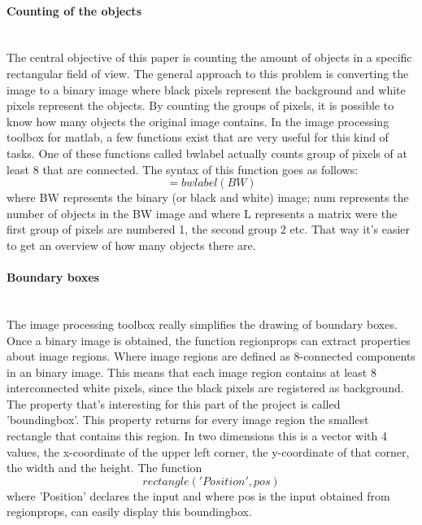 \documentclass{article}
\begin{document}
\paragraph{Counting of the objects}\mbox{}\\
The central objective of this paper is counting the amount of objects in a specific rectangular field of view. The general approach to this problem is converting the image to a binary image where black pixels represent the background and white pixels represent the objects. By counting the groups of pixels, it is possible to know how many objects the original image contains. In the image processing toolbox for matlab\cite{Mathworks}, a few functions exist that are very useful for this kind of tasks. One of these functions called bwlabel actually counts group of pixels of at least 8 that are connected. The syntax of this function goes as follows: 
\begin{equation}
[L, num] = bwlabel(BW)
\end{equation}
where BW represents the binary (or black and white) image; num represents the number of objects in the BW image and where L represents a matrix were the first group of pixels are numbered 1, the second group 2 etc. That way it’s easier to get an overview of how many objects there are.

\paragraph{Boundary boxes}\mbox{}\\
The image processing toolbox really simplifies the drawing of boundary boxes. Once a binary image is obtained, the function regionprops \cite{Mathworks} can extract properties about image regions. Where image regions are defined as 8-connected components in an binary image. This means that each image region contains at least 8 interconnected white pixels, since the black pixels are registered as background. The property that's interesting for this part of the project is called 'boundingbox'. This property returns for every image region the smallest rectangle that contains this region. In two dimensions this is a vector with 4 values, the x-coordinate of the upper left corner, the y-coordinate of that corner, the width and the height. The function 
\begin{equation}
rectangle('Position', pos)
\end{equation}
where 'Position' declares the input and where pos is the input obtained from regionprops, can easily display this boundingbox. 
\end{document}
